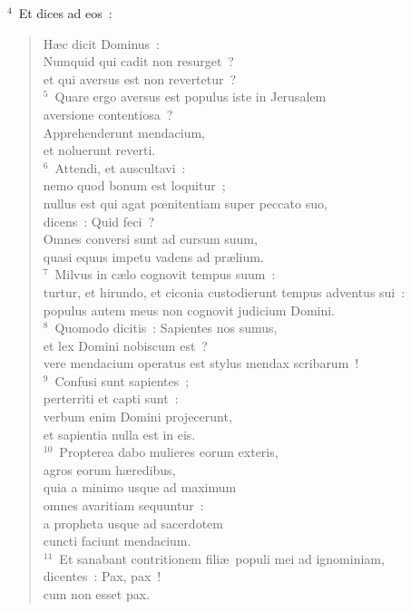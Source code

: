${}^{4}$~Et dices ad eos~: \begin{flushleft}\begin{verse}H\ae c dicit Dominus~:\\ Numquid qui cadit non resurget~?\\ et qui aversus est non revertetur~?\\
${}^{5}$~Quare ergo aversus est populus iste in Jerusalem\\ aversione contentiosa~?\\ Apprehenderunt mendacium,\\ et noluerunt reverti.\\
${}^{6}$~Attendi, et auscultavi~:\\ nemo quod bonum est loquitur~;\\ nullus est qui agat pœnitentiam super peccato suo,\\ dicens~: Quid feci~?\\ Omnes conversi sunt ad cursum suum,\\ quasi equus impetu vadens ad pr\ae lium.\\
${}^{7}$~Milvus in c\ae lo cognovit tempus suum~:\\ turtur, et hirundo, et ciconia custodierunt tempus adventus sui~:\\ populus autem meus non cognovit judicium Domini.\\
${}^{8}$~Quomodo dicitis~: Sapientes nos sumus,\\ et lex Domini nobiscum est~?\\ vere mendacium operatus est stylus mendax scribarum~!\\
${}^{9}$~Confusi sunt sapientes~;\\ perterriti et capti sunt~:\\ verbum enim Domini projecerunt,\\ et sapientia nulla est in eis.\\
${}^{10}$~Propterea dabo mulieres eorum exteris,\\ agros eorum h\ae redibus,\\ quia a minimo usque ad maximum\\ omnes avaritiam sequuntur~:\\ a propheta usque ad sacerdotem\\ cuncti faciunt mendacium.\\
${}^{11}$~Et sanabant contritionem fili\ae\ populi mei ad ignominiam,\\ dicentes~: Pax, pax~!\\ cum non esset pax.\\

\end{verse}
\end{flushleft}
